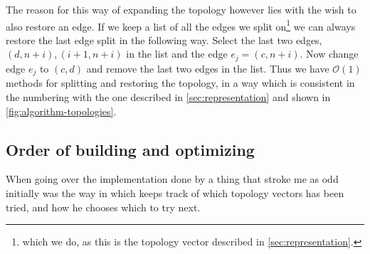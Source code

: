 The reason for this way of expanding the topology however lies with the wish to
also restore an edge. If we keep a list of all the edges we split
on\footnote{which we do, as this is the topology vector described in
  \cref{sec:representation}.} we can always restore the last edge split in the
following way. Select the last two edges, $(d, n+i), (i+1, n+i)$ in the list and
the edge $e_j = (c, n+i)$. Now change edge $e_j$ to $(c, d)$ and remove the last
two edges in the list. Thus we have $\mathcal{O}(1)$ methods for splitting and
restoring the topology, in a way which is consistent in the numbering with the
one described in \cref{sec:representation} and shown in
\cref{fig:algorithm-topologies}.

\subsection{Order of building and optimizing}
\label{sec:order-build-optim}

When going over the implementation done by \citeauthor{smith1992} a thing that
stroke me as odd initially was the way in which \citeauthor{smith1992} keeps
track of which topology vectors has been tried, and how he chooses which to try
next.


